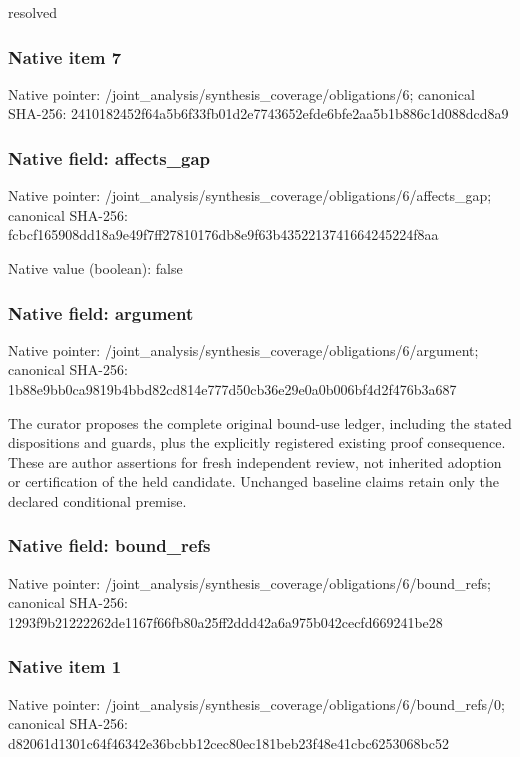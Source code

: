 \documentclass[10pt,a4paper]{article}
\begin{document}
\begingroup\raggedright\sloppy resolved\par\endgroup

\subsubsection{Native item 7}
Native pointer: /joint\_\allowbreak{}analysis/synthesis\_\allowbreak{}coverage/obligations/6; canonical SHA-256: 2410182452f64a5b6f33fb01d2e7743652efde6bfe2aa5b1b886c1d088dcd8a9

\subsubsection{Native field: affects\_\allowbreak{}gap}
Native pointer: /joint\_\allowbreak{}analysis/synthesis\_\allowbreak{}coverage/obligations/6/affects\_\allowbreak{}gap; canonical SHA-256: fcbcf165908dd18a9e49f7ff27810176db8e9f63b4352213741664245224f8aa

Native value (boolean): false

\subsubsection{Native field: argument}
Native pointer: /joint\_\allowbreak{}analysis/synthesis\_\allowbreak{}coverage/obligations/6/argument; canonical SHA-256: 1b88e9bb0ca9819b4bbd82cd814e777d50cb36e29e0a0b006bf4d2f476b3a687

\begingroup\raggedright\sloppy The curator proposes the complete original bound-use ledger,\allowbreak{} including the stated dispositions and guards,\allowbreak{} plus the explicitly registered existing proof consequence. These are author assertions for fresh independent review,\allowbreak{} not inherited adoption or certification of the held candidate. Unchanged baseline claims retain only the declared conditional premise.\par\endgroup

\subsubsection{Native field: bound\_\allowbreak{}refs}
Native pointer: /joint\_\allowbreak{}analysis/synthesis\_\allowbreak{}coverage/obligations/6/bound\_\allowbreak{}refs; canonical SHA-256: 1293f9b21222262de1167f66fb80a25ff2ddd42a6a975b042cecfd669241be28

\subsubsection{Native item 1}
Native pointer: /joint\_\allowbreak{}analysis/synthesis\_\allowbreak{}coverage/obligations/6/bound\_\allowbreak{}refs/0; canonical SHA-256: d82061d1301c64f46342e36bcbb12cec80ec181beb23f48e41cbc6253068bc52
\end{document}
